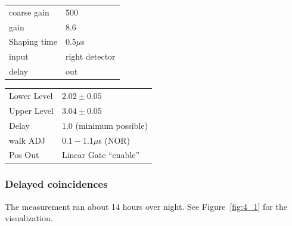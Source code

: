 \begin{minipage}{\textwidth}
  \begin{minipage}[b]{0.49\textwidth}
   \begin{tabular}{|l|l|}
        \hline
       coarse gain & 500 \\
       gain & 8.6 \\
       Shaping time & $0.5\mu$s \\
       input & right detector \\ 
        delay & out \\
        \hline
   \end{tabular}

  \end{minipage}
  \hfill
  \begin{minipage}[b]{0.49\textwidth}
    \centering
   \begin{tabular}{|l|l|}
        \hline
       Lower Level & $2.02\pm0.05$ \\
       Upper Level & $3.04\pm0.05$ \\
       Delay & 1.0 (minimum possible) \\
        walk ADJ & $0.1 - 1.1\mu$s (NOR)  \\
       Pos Out & Linear Gate ``enable''\\
        \hline
   \end{tabular}
\end{minipage}
\end{minipage}
\clearpage
\subsubsection{Delayed coincidences}
The measurement ran about 14 hours over night. See Figure~\ref{fig:4_1} for the visualization.
\label{ssub:Conduction of the experiment over night}

